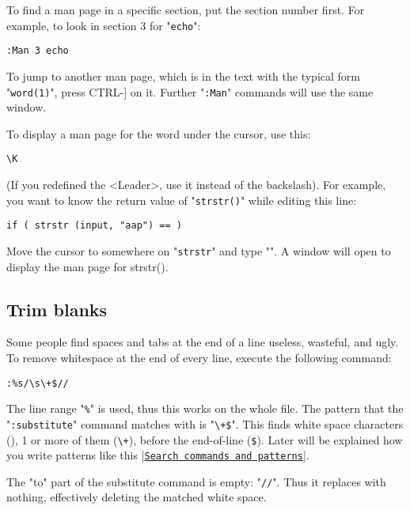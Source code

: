 {To find a man page in a specific section, put the section number first.
For example, to look in section 3 for "\texttt{echo}":

\begin{Verbatim}[samepage=true]
 :Man 3 echo
\end{Verbatim}

To jump to another man page, which is in the text with the typical form "\texttt{word(1)}", press CTRL-] on it.
Further "\texttt{:Man}" commands will use the same window.

To display a man page for the word under the cursor, use this:

\begin{Verbatim}[samepage=true]
 \K
\end{Verbatim}

(If you redefined the <Leader>, use it instead of the backslash).
For example, you want to know the return value of "\texttt{strstr()}" while editing
this line:

\begin{Verbatim}[samepage=true]
    if ( strstr (input, "aap") == ) 
\end{Verbatim}

Move the cursor to somewhere on "\texttt{strstr}" and type "\texttt{\textbackslashK}".
A window will open to display the man page for strstr().
\subsection{Trim blanks}
Some people find spaces and tabs at the end of a line useless, wasteful, and ugly.
To remove whitespace at the end of every line, execute the following command:

\begin{Verbatim}[samepage=true]
 :%s/\s\+$//
\end{Verbatim}

The line range "\texttt{\%}" is used, thus this works on the whole file.
The pattern that the "\texttt{:substitute}" command matches with is "\texttt{\textbackslashs\textbackslash+\$}".
This finds white space characters (\texttt{\textbackslashs}), 1 or more of them (\texttt{\textbackslash+}), before the end-of-line (\texttt{\$}).
Later will be explained how you write patterns like this |\hyperref[Search commands and patterns]{\texttt{Search commands and patterns}}|.

The "to" part of the substitute command is empty: "\texttt{//}".
Thus it replaces with nothing, effectively deleting the matched white space.

}
